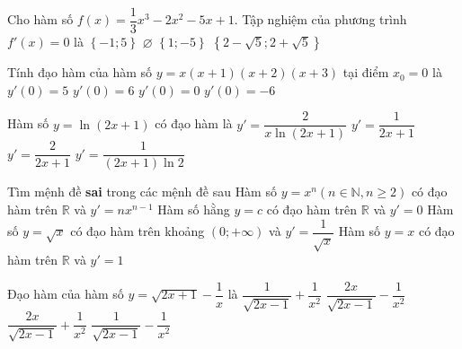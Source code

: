 \begin{ex}%
	Cho hàm số  $f(x)=\dfrac{1}{3}x^3-2x^2-5x+1$. Tập nghiệm của phương trình $f'(x)=0$ là
	\choice 
		{\True  $\left\{-1;5\right\}$}
		 {$\varnothing$}
		{$\left\{1;-5\right\}$} 
		 {$\left\{2-\sqrt{5};2+\sqrt{5}\right\}$}
\end{ex}

\begin{ex}%
	Tính đạo hàm của  hàm số $y=x\left(x+1\right)\left(x+2\right)\left(x+3\right)$ tại điểm $x_0=0$ là
	\choice 
		 {$y'(0)=5$}
		 {\True $y'(0)=6$}
		{$y'(0)=0$} 
		 {$y'(0)=-6$}
\end{ex}

\begin{ex}%
	Hàm số $y=\ln(2x+1)$ có đạo  hàm là
	\choice 
		{$y'=\dfrac{2}{x\ln(2x+1)}$} 
		{$y'=\dfrac{1}{2x+1}$} 
		{\True  $y'=\dfrac{2}{2x+1}$}
		{$y'=\dfrac{1}{(2x+1)\ln 2}$} 
\end{ex}

\begin{ex}%
	Tìm mệnh đề \textbf{sai} trong các  mệnh đề sau
	\choice 
		{Hàm số $y=x^n (n\in \mathbb{N},n\ge 2)$ có đạo hàm trên $\mathbb{R}$  và $y'=n{x}^{n-1}$}
		 {Hàm số hằng $y=c$ có đạo hàm trên $\mathbb{R}$ và $y'=0$}
		{\True Hàm số $y=\sqrt{x}$ có đạo hàm trên khoảng  $(0;+\infty)$ và $y'=\dfrac{1}{\sqrt{x}}$}
		{Hàm số $y=x$ có  đạo hàm trên $\mathbb{R}$ và $y'=1$}
\end{ex}

\begin{ex}%
	Đạo hàm của  hàm số $y=\sqrt{2x+1}-\dfrac{1}{x}$ là
	\choice 
		{\True  $\dfrac{1}{\sqrt{2x-1}}+\dfrac{1}{x^2}$}
		{$\dfrac{2x}{\sqrt{2x-1}}-\dfrac{1}{x^2}$} 
		 {$\dfrac{2x}{\sqrt{2x-1}}+\dfrac{1}{x^2}$}
		 {$\dfrac{1}{\sqrt{2x-1}}-\dfrac{1}{x^2}$}
\end{ex}

